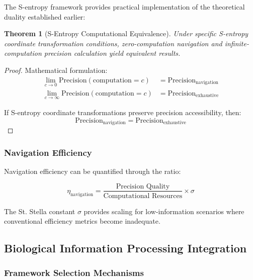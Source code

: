 \documentclass[12pt,a4paper]{article}
\newtheorem{theorem}{Theorem}[section]
\begin{document}
{The S-entropy framework provides practical implementation of the theoretical duality established earlier:

\begin{theorem}[S-Entropy Computational Equivalence]
Under specific S-entropy coordinate transformation conditions, zero-computation navigation and infinite-computation precision calculation yield equivalent results.
\end{theorem}

\begin{proof}
Mathematical formulation:
\begin{align}
\lim_{c \to 0} \text{Precision}(\text{computation} = c) &= \text{Precision}_{\text{navigation}} \\
\lim_{c \to \infty} \text{Precision}(\text{computation} = c) &= \text{Precision}_{\text{exhaustive}}
\end{align}

If S-entropy coordinate transformations preserve precision accessibility, then:
\begin{equation}
\text{Precision}_{\text{navigation}} = \text{Precision}_{\text{exhaustive}}
\end{equation}
\end{proof}

\subsubsection{Navigation Efficiency}

Navigation efficiency can be quantified through the ratio:

\begin{equation}
\eta_{\text{navigation}} = \frac{\text{Precision Quality}}{\text{Computational Resources}} \times \sigma
\label{eq:navigation_efficiency}
\end{equation}

The St. Stella constant $\sigma$ provides scaling for low-information scenarios where conventional efficiency metrics become inadequate.

\subsection{Biological Information Processing Integration}

\subsubsection{Framework Selection Mechanisms}

}
\end{document}
